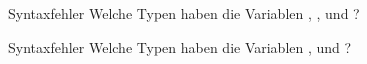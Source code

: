 \begin{task}{Syntaxfehler}
    Welche Typen haben die Variablen , ,  und ?
\end{task}

\begin{task}{Syntaxfehler}
    Welche Typen haben die Variablen ,  und ?
\end{task}
